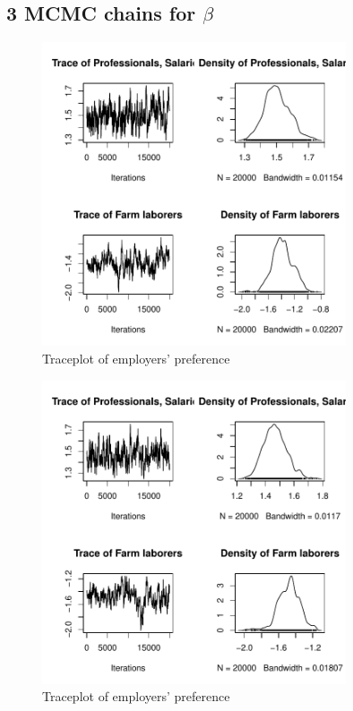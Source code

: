 \documentclass[12pt]{article}
\begin{document}
\subsection{3 MCMC chains for $\beta$}

\begin{figure}[!ht]
\centering
\includegraphics[width=0.8\textwidth]{../figure/trace_beta_adaptive_replicate1}
\caption{Traceplot of employers' preference}
\end{figure}

\begin{figure}[!ht]
\centering
\includegraphics[width=0.8\textwidth]{../figure/trace_beta_adaptive_replicate2}
\caption{Traceplot of employers' preference}
\end{figure}
\end{document}
